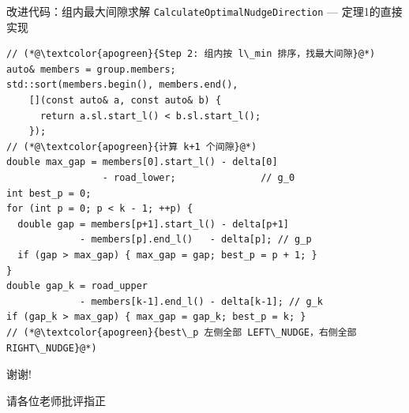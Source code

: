 \documentclass[aspectratio=169,10pt,fontset=none]{ctexbeamer}
\begin{document}
\begin{frame}[fragile]{改进代码：组内最大间隙求解}
  \vspace{-0.2cm}
  {\small\texttt{CalculateOptimalNudgeDirection} --- 定理1的直接实现}
  \vspace{0.1cm}
\begin{lstlisting}
// (*@\textcolor{apogreen}{Step 2: 组内按 l\_min 排序，找最大间隙}@*)
auto& members = group.members;
std::sort(members.begin(), members.end(),
    [](const auto& a, const auto& b) {
      return a.sl.start_l() < b.sl.start_l();
    });
// (*@\textcolor{apogreen}{计算 k+1 个间隙}@*)
double max_gap = members[0].start_l() - delta[0]
                 - road_lower;               // g_0
int best_p = 0;
for (int p = 0; p < k - 1; ++p) {
  double gap = members[p+1].start_l() - delta[p+1]
             - members[p].end_l()   - delta[p]; // g_p
  if (gap > max_gap) { max_gap = gap; best_p = p + 1; }
}
double gap_k = road_upper
             - members[k-1].end_l() - delta[k-1]; // g_k
if (gap_k > max_gap) { max_gap = gap_k; best_p = k; }
// (*@\textcolor{apogreen}{best\_p 左侧全部 LEFT\_NUDGE，右侧全部 RIGHT\_NUDGE}@*)
\end{lstlisting}
\end{frame}

\begin{frame}
  \begin{center}
    \vspace{1.5cm}
    {\Huge 谢谢!}

    \vspace{1cm}
    {\large 请各位老师批评指正}
  \end{center}
\end{frame}
\end{document}
